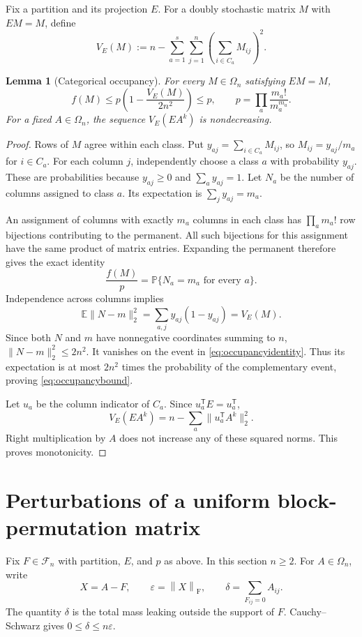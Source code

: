 \documentclass[11pt]{article}
\newtheorem{lemma}[theorem]{Lemma}
\theoremstyle{remark}\newtheorem{remark}[theorem]{Remark}
\newcommand{\Om}{\Omega_n}
\newcommand{\Fset}{\mathcal F_n}
\newcommand{\fn}[1]{\left\|#1\right\|_{\mathrm F}}
\newcommand{\eps}{\varepsilon}
\begin{document}
Fix a partition and its projection $E$. For a doubly stochastic matrix
$M$ with $EM=M$, define
\begin{equation}\label{eq:variance}
 V_E(M):=n-\sum_{a=1}^s\sum_{j=1}^n
 \left(\sum_{i\in C_a}M_{ij}\right)^2.
\end{equation}
\begin{lemma}[Categorical occupancy]\label{lem:occupancy}
For every $M\in\Om$ satisfying $EM=M$,
\begin{equation}\label{eq:occupancybound}
 f(M)\le p\left(1-\frac{V_E(M)}{2n^2}\right)\le p,
 \qquad p=\prod_a\frac{m_a!}{m_a^{m_a}}.
\end{equation}
For a fixed $A\in\Om$, the sequence $V_E(EA^k)$ is nondecreasing.
\end{lemma}
\begin{proof}
Rows of $M$ agree within each class. Put
$y_{aj}=\sum_{i\in C_a}M_{ij}$, so $M_{ij}=y_{aj}/m_a$ for $i\in C_a$.
For each column $j$, independently choose a class $a$ with probability
$y_{aj}$. These are probabilities because $y_{aj}\ge0$ and
$\sum_a y_{aj}=1$. Let $N_a$ be the number of columns assigned to class
$a$. Its expectation is $\sum_j y_{aj}=m_a$.

An assignment of columns with exactly $m_a$ columns in each class has
$\prod_a m_a!$ row bijections contributing to the permanent. All such
bijections for this assignment have the same product of matrix entries.
Expanding the permanent therefore gives the exact identity
\begin{equation}\label{eq:occupancyidentity}
 \frac{f(M)}{p}=\mathbb P\{N_a=m_a\text{ for every }a\}.
\end{equation}
Independence across columns implies
\[
 \mathbb E\|N-m\|_2^2=\sum_{a,j}y_{aj}(1-y_{aj})=V_E(M).
\]
Since both $N$ and $m$ have nonnegative coordinates summing to $n$,
$\|N-m\|_2^2\le2n^2$. It vanishes on the event in
\eqref{eq:occupancyidentity}. Thus its expectation is at most
$2n^2$ times the probability of the complementary event, proving
\eqref{eq:occupancybound}.

Let $u_a$ be the column indicator of $C_a$. Since $u_a^{\mathsf T}E=
u_a^{\mathsf T}$,
\[
 V_E(EA^k)=n-\sum_a\|u_a^{\mathsf T}A^k\|_2^2.
\]
Right multiplication by $A$ does not increase any of these squared
norms. This proves monotonicity.
\end{proof}

\section{Perturbations of a uniform block-permutation matrix}
Fix $F\in\Fset$ with partition, $E$, and $p$ as above. In this section
$n\ge2$. For $A\in\Om$, write
\begin{equation}\label{eq:epsdelta}
 X=A-F,\qquad \eps=\fn X,\qquad
 \delta=\sum_{F_{ij}=0}A_{ij}.
\end{equation}
The quantity $\delta$ is the total mass leaking outside the support of
$F$. Cauchy--Schwarz gives $0\le\delta\le n\eps$.
\end{document}

